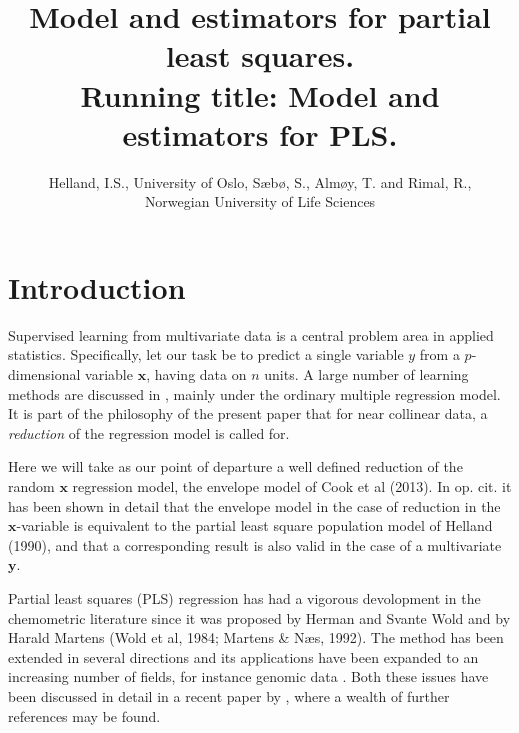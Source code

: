\documentclass[a4paper, 11pt]{article}
\begin{document}
\title{Model and estimators for partial least squares.\\
  Running title: Model and estimators for PLS.}

\author{Helland, I.S., University of Oslo,  S\ae b\o , S., Alm\o y, T.  and Rimal, R.,\\
  Norwegian University of Life Sciences}

\maketitle

\begin{abstract}

\end{abstract}

\setcounter{tocdepth}{1}
\tableofcontents

\onehalfspacing

\section{Introduction}

Supervised learning from multivariate data is a central problem area in applied statistics. Specifically, let our task be to predict a single variable $y$ from a $p$-dimensional variable $\bm{x}$, having data on $n$ units. A large number of learning methods are discussed in \citet{hastie2009elements}, mainly under the ordinary multiple regression model. It is part of the philosophy of the present paper that for near collinear data, a \emph{reduction} of the regression model is called for.

Here we will take as our point of departure a well defined reduction of the random $\bm{x}$ regression model, the envelope model of \citet{cook2013envelopes} Cook et al (2013). In op. cit. it has been shown in detail that the envelope model in the case of reduction in the $\bm{x}$-variable is equivalent to the partial least square population model of \citet{helland1990partial} Helland (1990), and that a corresponding result is also valid in the case of a multivariate $\bm{y}$.

Partial least squares (PLS) regression has had a vigorous devolopment in the chemometric literature since it was proposed by Herman and Svante Wold and by Harald Martens \citep{wold1984collinearity, martens1992multivariate} (Wold et al, 1984; Martens \& N\ae s, 1992). The method has been extended in several directions and its applications have been expanded to an increasing number of fields, for instance genomic data \citep{boulesteix2007partial}. Both these issues have been discussed in detail in a recent paper by \citet{mehmood2016diversity}, where a wealth of further references may be found.
\end{document}
